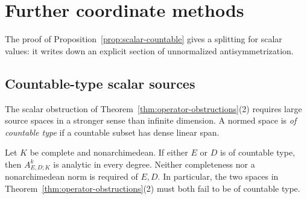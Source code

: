 \section{Further coordinate methods}\label{app:coordinate-methods}
The proof of Proposition~\ref{prop:scalar-countable} gives a splitting for scalar values: it writes down an explicit section of unnormalized antisymmetrization.

\subsection{Countable-type scalar sources}
The scalar obstruction of Theorem~\ref{thm:operator-obstructions}(2) requires large source spaces in a stronger sense than infinite dimension.
A normed space is \emph{of countable type} if a countable subset has dense linear span.

\begin{proposition}\label{prop:scalar-countable}
Let $K$ be complete and nonarchimedean. If either $E$ or $D$ is of countable type, then
$A^k_{E,D;K}$ is analytic in every degree. Neither completeness nor a nonarchimedean norm
is required of $E,D$. In particular, the two spaces in
Theorem~\ref{thm:operator-obstructions}(2) must both fail to be of countable type.
\end{proposition}


